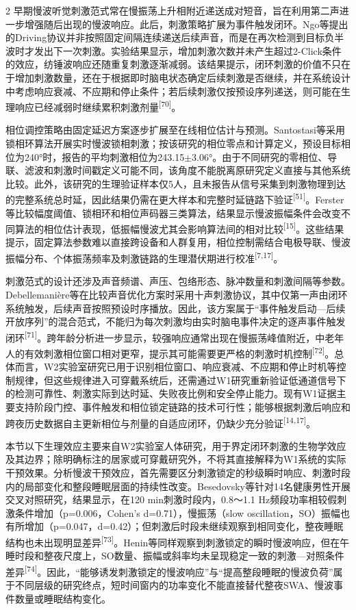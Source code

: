 \documentclass[UTF8,zihao=5,fontset=none]{ctexart}
\newcommand{\hei}{\CJKfamily{hei}}
\newcommand{\leveltwo}[1]{%
  \par\noindent{\hei\fontsize{10.5pt}{15.6pt}\selectfont\bfseries #1\par}}
\newcommand{\refcite}[1]{\nolinebreak[4]\textsuperscript{[#1]}}
\begin{document}
\begin{multicols}{2}
早期慢波听觉刺激范式常在慢振荡上升相附近递送成对短音，旨在利用第二声进一步增强随后出现的慢波响应。此后，刺激策略扩展为事件触发闭环。Ngo等提出的Driving协议并非按照固定间隔连续递送后续声音，而是在再次检测到目标负半波时才发出下一次刺激。实验结果显示，增加刺激次数并未产生超过2-Click条件的效应，纺锤波响应还随重复刺激逐渐减弱。该结果提示，闭环刺激的价值不只在于增加刺激数量，还在于根据即时脑电状态确定后续刺激是否继续，并在系统设计中考虑响应衰减、不应期和停止条件；若后续刺激仅按预设序列递送，则可能在生理响应已经减弱时继续累积刺激剂量\refcite{70}。\par

相位调控策略由固定延迟方案逐步扩展至在线相位估计与预测。Santostasi等采用锁相环算法开展实时慢波锁相刺激；按该研究的相位零点和计算定义，预设目标相位为240°时，报告的平均刺激相位为243.15$\pm$3.06°。由于不同研究的零相位、导联、滤波和刺激时间戳定义可能不同，该角度不能脱离原研究定义直接与其他系统比较。此外，该研究的生理验证样本仅5人，且未报告从信号采集到刺激物理到达的完整系统总时延，因此结果仍需在更大样本和完整时延链路下验证\refcite{51}。Ferster等比较幅度阈值、锁相环和相位声码器三类算法，结果显示慢波振幅条件会改变不同算法的相位估计表现，低振幅慢波尤其会影响算法间的相对比较\refcite{15}。这些结果提示，固定算法参数难以直接跨设备和人群复用，相位控制需结合电极导联、慢波振幅分布、个体振荡频率及刺激链路的生理潜伏期进行校准\refcite{7,17}。\par

刺激范式的设计还涉及声音频谱、声压、包络形态、脉冲数量和刺激间隔等参数。Debellemanière等在比较声音优化方案时采用十声刺激协议，其中仅第一声由闭环系统触发，后续声音按照预设时序播放。因此，该方案属于“事件触发启动—后续开放序列”的混合范式，不能归为每次刺激均由实时脑电事件决定的逐声事件触发闭环\refcite{71}。跨年龄分析进一步显示，较强响应通常出现在慢振荡峰值附近，中老年人的有效刺激相位窗口相对更窄，提示其可能需要更严格的刺激时机控制\refcite{72}。总体而言，W2实验室研究已用于识别相位窗口、响应衰减、不应期和停止时机等控制规律，但这些规律进入可穿戴系统后，还需通过W1研究重新验证低通道信号下的检测可靠性、刺激实际到达时延、失败夜比例和安全停止能力。现有W1证据主要支持阶段门控、事件触发和相位锁定链路的技术可行性；能够根据刺激后响应和跨夜历史数据自主更新相位与剂量的自适应闭环，仍缺少充分验证\refcite{14,17}。\par

\leveltwo{3.2 慢波与纺锤活动调制及其耦合的生理证据}

本节以下生理效应主要来自W2实验室人体研究，用于界定闭环刺激的生物学效应及其边界；除明确标注的居家或可穿戴研究外，不将其直接解释为W1系统的实际干预效果。分析慢波干预效应，首先需要区分刺激锁定的秒级瞬时响应、刺激时段内的局部变化和整段睡眠层面的持续性改变。Besedovsky等针对14名健康男性开展交叉对照研究，结果显示，在120 min刺激时段内，0.8～1.1 Hz频段功率相较假刺激条件增加（p=0.006，Cohen's d=0.71），慢振荡（slow oscillation，SO）振幅也有所增加（p=0.047，d=0.42）；但刺激后时段未继续观察到相同变化，整夜睡眠结构也未出现明显差异\refcite{73}。Henin等同样观察到刺激锁定的瞬时慢波响应，但在午睡时段和整夜尺度上，SO数量、振幅或斜率均未呈现稳定一致的刺激—对照条件差异\refcite{74}。因此，“能够诱发刺激锁定的慢波响应”与“提高整段睡眠的慢波负荷”属于不同层级的研究终点，短时间窗内的功率变化不能直接替代整夜SWA、慢波事件数量或睡眠结构变化。\par


\end{multicols}
\end{document}
